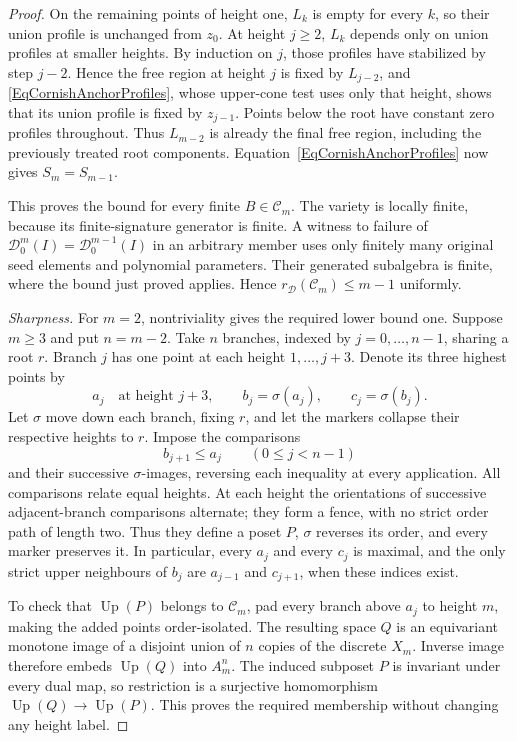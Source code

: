 \documentclass[12pt,english]{amsart}
\theoremstyle{definition}
\numberwithin{equation}{section}
\theoremstyle{remark}
\begin{document}
\begin{proof}
On the remaining points of height one, $L_k$ is empty for every $k$,
so their union profile is unchanged from $z_0$. At height $j\geqslant2$,
$L_k$ depends only on union profiles at smaller heights. By induction
on $j$, those profiles have stabilized by step $j-2$. Hence the free
region at height $j$ is fixed by $L_{j-2}$, and
\eqref{EqCornishAnchorProfiles}, whose upper-cone test uses only that
height, shows that its union profile is fixed by $z_{j-1}$. Points
below the root have constant zero profiles throughout. Thus $L_{m-2}$
is already the final free region, including the previously treated
root components. Equation~\eqref{EqCornishAnchorProfiles} now gives
$S_m=S_{m-1}$.

This proves the bound for every finite $B\in\mathcal C_m$. The
variety is locally finite, because its finite-signature generator is
finite. A witness to failure of
$\mathcal D_0^m(I)=\mathcal D_0^{m-1}(I)$ in an arbitrary member uses
only finitely many original seed elements and polynomial parameters.
Their generated subalgebra is finite, where the bound just proved
applies. Hence $r_{\mathcal D}(\mathcal C_m)\leqslant m-1$ uniformly.

\emph{Sharpness.}
For $m=2$, nontriviality gives the required lower bound one. Suppose
$m\geqslant3$ and put $n=m-2$. Take $n$ branches, indexed by
$j=0,\ldots,n-1$, sharing a root $r$. Branch $j$ has one point at each
height $1,\ldots,j+3$. Denote its three highest points by
\[
a_j\quad\text{at height }j+3,\qquad
b_j=\sigma(a_j),\qquad c_j=\sigma(b_j).
\]
Let $\sigma$ move down each branch, fixing $r$, and let the markers
collapse their respective heights to $r$. Impose the comparisons
\[
b_{j+1}\leqslant a_j\qquad(0\leqslant j<n-1)
\]
and their successive $\sigma$-images, reversing each inequality at
every application. All comparisons relate equal heights. At each
height the orientations of successive adjacent-branch comparisons
alternate; they form a fence, with no strict order path of length two.
Thus they define a poset $P$, $\sigma$ reverses its order, and every
marker preserves it. In particular, every $a_j$ and every $c_j$ is
maximal, and the only strict upper neighbours of $b_j$ are
$a_{j-1}$ and $c_{j+1}$, when these indices exist.

To check that $\operatorname{Up}(P)$ belongs to $\mathcal C_m$, pad
every branch above $a_j$ to height $m$, making the added points
order-isolated. The resulting space $Q$ is an equivariant monotone
image of a disjoint union of $n$ copies of the discrete $X_m$.
Inverse image therefore embeds $\operatorname{Up}(Q)$ into $A_m^n$.
The induced subposet $P$ is invariant under every dual map, so
restriction is a surjective homomorphism
$\operatorname{Up}(Q)\to\operatorname{Up}(P)$. This proves the
required membership without changing any height label.


\end{proof}
\end{document}
